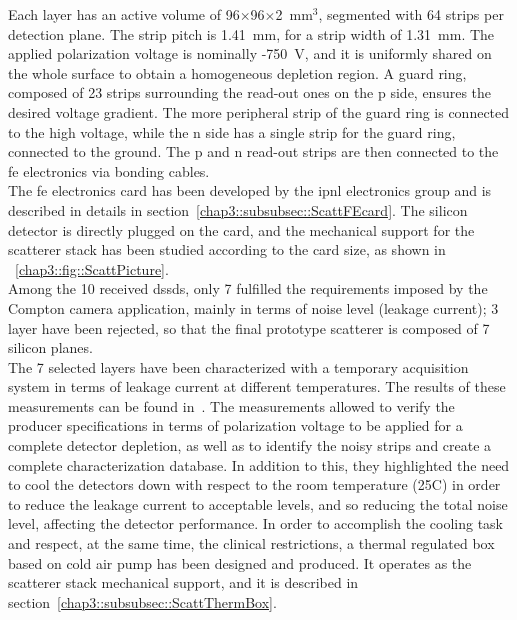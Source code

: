 Each layer has an active volume of 96$\times$96$\times$2~mm$^{3}$, segmented with 64 strips per detection plane. The strip pitch is 1.41~mm, for a strip width of 1.31~mm. The applied polarization voltage is nominally -750~V, and it is uniformly shared on the whole surface to obtain a homogeneous depletion region. A guard ring, composed of 23 strips surrounding the read-out ones on the p side, ensures the desired voltage gradient. The more peripheral strip of the guard ring is connected to the high voltage, while the n side has a single strip for the guard ring, connected to the ground. The p and n read-out strips are then connected to the \gls{fe} electronics via bonding cables.\\
The \gls{fe} electronics card has been developed by the \gls{ipnl} electronics group and is described in details in section~\ref{chap3::subsubsec::ScattFEcard}. The silicon detector is directly plugged on the card, and the mechanical support for the scatterer stack has been studied according to the card size, as shown in \figurename~\ref{chap3::fig::ScattPicture}.\\   
Among the 10 received \glspl{dssd}, only 7 fulfilled the requirements imposed by the Compton camera application, mainly in terms of noise level (leakage current); 3 layer have been rejected, so that the final prototype scatterer is composed of 7 silicon planes.\\
The 7 selected layers have been characterized with a temporary acquisition system in terms of leakage current at different temperatures. The results of these measurements can be found in~\cite{Ley2015}. The measurements allowed to verify the producer specifications in terms of polarization voltage to be applied for a complete detector depletion, as well as to identify the noisy strips and create a complete characterization database. In addition to this, they highlighted the need to cool the detectors down with respect to the room temperature (25\textdegree{}C) in order to reduce the leakage current to acceptable levels, and so reducing the total noise level, affecting the detector performance. In order to accomplish the cooling task and respect, at the same time, the clinical restrictions, a thermal regulated box based on cold air pump has been designed and produced. It operates as the scatterer stack mechanical support, and it is described in section~\ref{chap3::subsubsec::ScattThermBox}.\\
      
 


